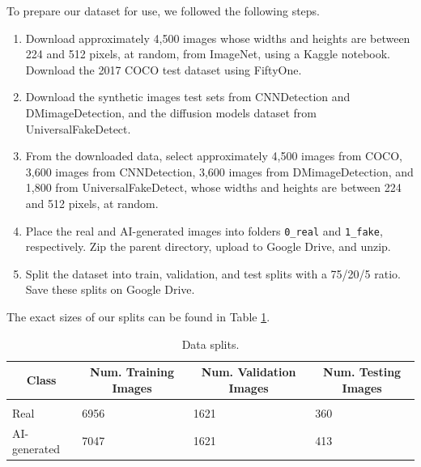 \documentclass{article} %
\begin{document}
To prepare our dataset for use, we followed the following steps.
\begin{enumerate}
    \item[1.] Download approximately 4,500 images whose widths and heights are between 224 and 512 pixels, at random, from ImageNet, using a Kaggle notebook. Download the 2017 COCO test dataset using FiftyOne.
    \item[2.] Download the synthetic images test sets from CNNDetection and DMimageDetection, and the diffusion models dataset from UniversalFakeDetect.
    \item[3.] From the downloaded data, select approximately 4,500 images from COCO, 3,600 images from CNNDetection, 3,600 images from DMimageDetection, and 1,800 from UniversalFakeDetect, whose widths and heights are between 224 and 512 pixels, at random.
    \item[4.] Place the real and AI-generated images into folders \texttt{0\_real} and \texttt{1\_fake}, respectively. Zip the parent directory, upload to Google Drive, and unzip.
    \item[5.] Split the dataset into train, validation, and test splits with a 75/20/5 ratio. Save these splits on Google Drive.
\end{enumerate}

The exact sizes of our splits can be found in Table \ref{data_splits}.

\begin{table}[t]
    \caption{Data splits.}
    \label{data_splits}
    \begin{center}
        \begin{tabular}{llll}
            \multicolumn{1}{c}{\bf Class} & \multicolumn{1}{c}{\bf Num. Training Images} & \multicolumn{1}{c}{\bf Num. Validation Images} & \multicolumn{1}{c}{\bf Num. Testing Images}
            \\ \hline \\
            Real                          & 6956                                         & 1621                                           & 360                                         \\
            AI-generated                  & 7047                                         & 1621                                           & 413                                         \\
        \end{tabular}
    \end{center}
\end{table}
\end{document}
